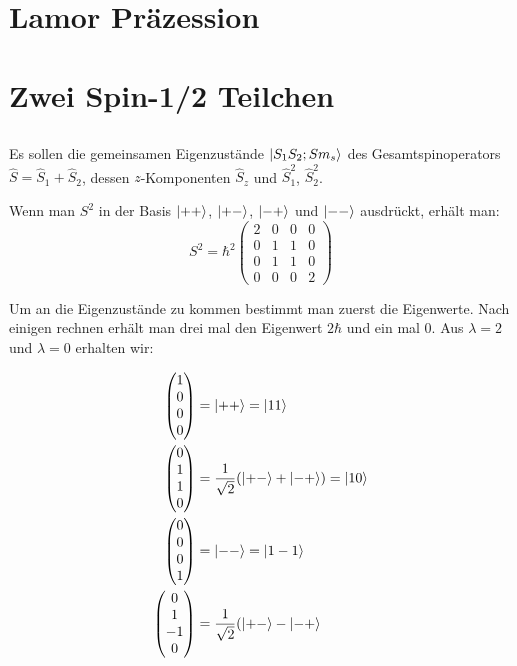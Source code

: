 \section{Lamor Präzession}

\section{Zwei Spin-1/2 Teilchen}
\subsection{}

Es sollen die gemeinsamen Eigenzustände $\left|S_1S_2;Sm_s\right\rangle$ des
Gesamtspinoperators $\hat S=\hat S_1+\hat S_2$, dessen $z$-Komponenten $\hat
S_z$ und $\hat S_1^2$, $\hat S_2^2$.

Wenn man $S^2$ in der Basis $\left|++\right\rangle$, $\left|+-\right\rangle$, $\left|-+\right\rangle$ und $\left|--\right\rangle$
ausdrückt, erhält man:
\[
    S^2 = \hbar^2 \begin{pmatrix}
        2 &0 &0 &0 \\
        0 &1 &1 &0 \\
        0 &1 &1 &0 \\
        0 &0 &0 &2
    \end{pmatrix}
\]

Um an die Eigenzustände zu kommen bestimmt man zuerst die Eigenwerte. Nach einigen rechnen erhält man drei mal den Eigenwert $2\hbar$ und ein mal 0. 
Aus $\lambda = 2$ und $\lambda = 0$ erhalten wir:

\begin{align*}
\begin{pmatrix} 1 \\ 0 \\ 0 \\ 0 \end{pmatrix} &= \left|++\right\rangle = \left|11\right\rangle \\
\begin{pmatrix} 0 \\ 1 \\ 1 \\ 0 \end{pmatrix} &= \frac{1}{\sqrt 2}(\left|+-\right\rangle+\left|-+\right\rangle) = \left|10\right\rangle \\
\begin{pmatrix} 0 \\ 0 \\ 0 \\ 1 \end{pmatrix} &= \left|--\right\rangle = \left|1-1\right\rangle \\
\begin{pmatrix} 0 \\ 1 \\ -1 \\ 0 \end{pmatrix} &=\frac 1{\sqrt 2}(\left|+-\right\rangle-\left|-+\right\rangle \\
\end{align*}

